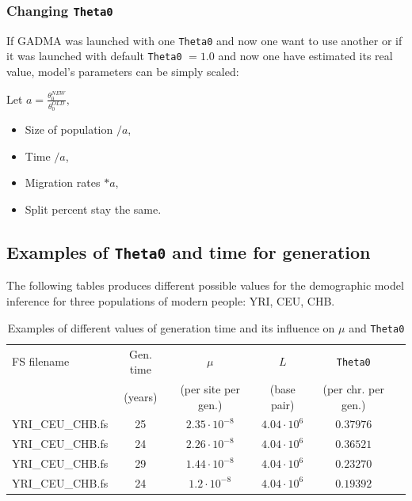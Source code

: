 \documentclass[12pt]{article}
\makeatletter
\newcommand{\py}[1]{\lstinline[language=Python, showstringspaces=False]@#1@}
\makeatother
\begin{document}
\subsubsection{Changing \py{Theta0}}
\label{sec:change-theta}
If GADMA was launched with one \py{Theta0} and now one want to use another or if it was launched with default \py{Theta0} $ = 1.0$ and now one have estimated its real value,  model's parameters can be simply scaled:

Let  $a = \frac{\displaystyle \theta_0^{NEW}}{\displaystyle \theta_0^{OLD}},$
\begin{itemize}
    \item Size of population $/ a$,
    \item Time $/ a$,
    \item Migration rates $* a$,
    \item Split percent stay the same.
\end{itemize}

\subsection{Examples of \py{Theta0} and time for generation}
The following tables produces different possible values for the demographic model inference for three populations of modern people: YRI, CEU, CHB.
\begin{table}[h]
    \centering
    \begin{tabular}{|l|c|c|c|c|l|}
        \hline
        FS filename	        & Gen. time  &	$\mu$	   &      $L$	   & \py{Theta0} \\
                            & (years)   & (per site per gen.)  & (base pair) & (per chr. per gen.)\\
        \hline
        YRI\_CEU\_CHB.fs	& 25 \cite{gutenkunst2009}   & $2.35 \cdot 10^{-8}$ \cite{gutenkunst2009} & $4.04 \cdot 10^6$ \cite{gutenkunst2009} & $0.37976$ \\
        YRI\_CEU\_CHB.fs	& 24 \cite{lapierre2017accuracy} & $2.26 \cdot 10^{-8}$ \cite{gutenkunst2009} & $4.04 \cdot 10^6$ \cite{gutenkunst2009} & $0.36521$ \\
        YRI\_CEU\_CHB.fs	& 29 \cite{Jouganous1549}	& $1.44 \cdot 10^{-8}$ \cite{Jouganous1549} & $4.04 \cdot 10^6$ \cite{gutenkunst2009} & $0.23270$ \\
        YRI\_CEU\_CHB.fs	& 24 \cite{lapierre2017accuracy} & $1.2 \cdot 10^{-8}$ \cite{Jouganous1549}  & $4.04 \cdot 10^6$ \cite{gutenkunst2009} & $0.19392$  \\
        \hline
    \end{tabular}
    \caption{Examples of different values of generation time and its influence on $\mu$ and \py{Theta0}}
    \label{tab:my_label}
\end{table}
\end{document}
